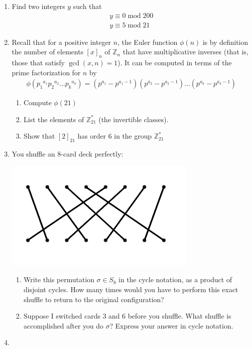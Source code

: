 \documentclass[12pt]{article}
\begin{document}
\begin{enumerate}
\newpage
\item
Find two integers $y$ such that
\begin{align*}
y\equiv 0 \operatorname{mod}200\\
y\equiv 5 \operatorname{mod}21
\end{align*}
\newpage
\item
Recall that for a positive integer $n$, the Euler function $\phi(n)$ is by definition the number of elements $[x]_n$ of $\mathbb{Z}_n$ that have multiplicative inverses (that is, those that satisfy $\operatorname{gcd}(x,n)=1$).  It can be computed in terms of the prime factorization for $n$ by
\begin{align*}
\phi({p_1}^{a_1}{p_2}^{a_2}...{p_k}^{a_k})=(p^{a_1}-p^{a_1-1})(p^{a_2}-p^{a_2-1})...(p^{a_k}-p^{a_k-1})
\end{align*}
\begin{enumerate}
\item
Compute $\phi(21)$
\item
List the elements of $\mathbb{Z}_{21}^{*}$ (the invertible classes).
\item
Show that $[2]_{21}$ has order 6 in the group $\mathbb{Z}_{21}^{*}$
\end{enumerate}
\newpage
\item
You shuffle an 8-card deck perfectly:
\begin{center}
\includegraphics{shuffle.png}
\end{center}
\begin{enumerate}
\item
Write this permutation $\sigma\in S_{8}$ in the cycle notation, as a product of disjoint cycles.  How many times would you have to perform this exact shuffle to return to the original configuration?
\item
Suppose I switched cards 3 and 6 before you shuffle.  What shuffle is accomplished after you do $\sigma$?  Express your answer in cycle notation.
\end{enumerate}
\newpage
\item

\end{enumerate}
\end{document}
